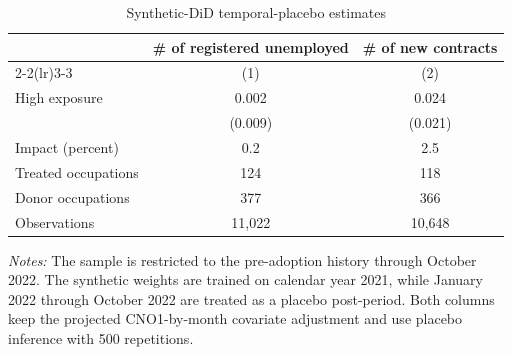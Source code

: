 \begin{table}[!htbp]
\centering
\caption{Synthetic-DiD temporal-placebo estimates}
\label{tab:v1_sdid_temporal_placebo}
\begin{threeparttable}
\small
\setlength{\tabcolsep}{4pt}
\begin{tabular}{lcc}
\toprule
& \multicolumn{1}{c}{\# of registered unemployed} & \multicolumn{1}{c}{\# of new contracts} \\
\cmidrule(lr){2-2}\cmidrule(lr){3-3}
& (1) & (2) \\
\midrule
High exposure & 0.002 & 0.024 \\
 & (0.009) & (0.021) \\
Impact (percent) & 0.2 & 2.5 \\
\midrule
Treated occupations & 124 & 118 \\
Donor occupations & 377 & 366 \\
Observations & 11,022 & 10,648 \\
\bottomrule
\end{tabular}
\begin{tablenotes}[flushleft]
\footnotesize
\item \emph{Notes:} The sample is restricted to the pre-adoption history through October 2022. The synthetic weights are trained on calendar year 2021, while January 2022 through October 2022 are treated as a placebo post-period. Both columns keep the projected CNO1-by-month covariate adjustment and use placebo inference with 500 repetitions.
\end{tablenotes}
\end{threeparttable}
\end{table}
